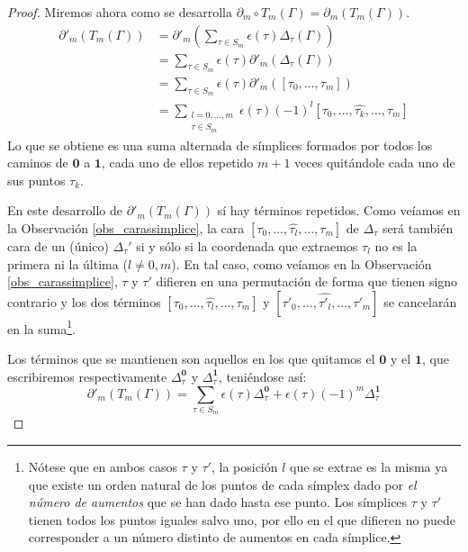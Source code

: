 \documentclass[12pt,a4paper,twoside]{article} %
\theoremstyle{plain}
\theoremstyle{definition}
\begin{document}
\begin{proof}
Miremos ahora como se desarrolla $\partial_m \circ T_m (\Gamma) = \partial_m \left( T_m (\Gamma) \right)$.
\begin{align*}
\partial'_m \left( T_m (\Gamma) \right) &= \partial'_m \left( \sum_{\tau \in S_m} \epsilon(\tau) \Delta_\tau(\Gamma) \right) \\
                                        &= \sum_{\tau \in S_m} \epsilon(\tau) \partial'_m \left(  \Delta_\tau(\Gamma) \right) \\
                                        &= \sum_{\tau \in S_m} \epsilon(\tau) \partial'_m \left(  [\tau_0,\dots,\tau_m] \right) \\
                                        &= \sum_{\substack{l=0,\dots,m \\ \tau \in S_m}} \epsilon(\tau) (-1)^l [\tau_0,\dots,\hat{\tau_k},\dots,\tau_m]
\end{align*}
Lo que se obtiene es una suma alternada de símplices formados por todos los caminos de $\bm{0}$ a $\bm{1}$, cada uno de ellos repetido $m+1$ veces quitándole cada uno de sus puntos $\tau_k$.

En este desarrollo de $\partial'_m \left( T_m (\Gamma) \right)$ sí hay términos repetidos. Como veíamos en la Observación \ref{obs_carassimplice}, la cara $[\tau_0,\dots,\hat{\tau_l},\dots,\tau_m]$ de $\Delta_\tau$ será también cara de un (único) $\Delta_\tau'$ si y sólo si la coordenada que extraemos $\tau_l$ no es la primera ni la última ($l \neq 0,m$). En tal caso, como veíamos en la Observación \ref{obs_carassimplice}, $\tau$ y $\tau'$ difieren en una permutación de forma que tienen signo contrario y los dos términos $[\tau_0,\dots,\hat{\tau_l},\dots,\tau_m]$ y $[\tau'_0,\dots,\hat{\tau'_l},\dots,\tau'_m]$ se cancelarán en la suma\footnote{Nótese que en ambos casos $\tau$ y $\tau'$, la posición $l$ que se extrae es la misma ya que existe un orden natural de los puntos de cada símplex dado por \emph{el número de aumentos} que se han dado hasta ese punto. Los símplices $\tau$ y $\tau'$ tienen todos los puntos iguales salvo uno, por ello en el que difieren no puede corresponder a un número distinto de aumentos en cada símplice.}.

Los términos que se mantienen son aquellos en los que quitamos el $\bm{0}$ y el $\bm{1}$, que escribiremos respectivamente $\Delta_\tau^{\bm{0}}$ y $\Delta_\tau^{\bm{1}}$, teniéndose así:
$$
\partial'_m \left( T_m (\Gamma) \right) = \sum_{\tau \in S_m} \epsilon(\tau) \Delta_\tau^{\bm{0}} + \epsilon(\tau) (-1)^m \Delta_\tau^{\bm{1}}
$$


\end{proof}
\end{document}
